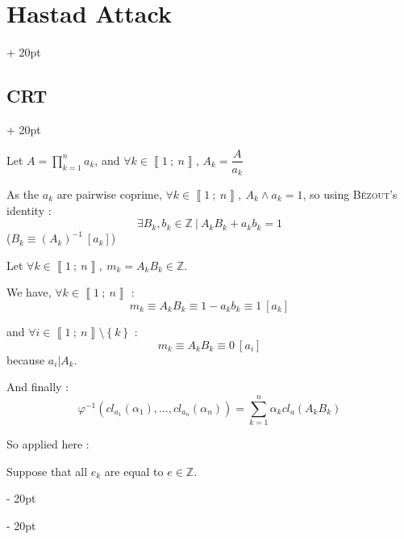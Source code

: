 \documentclass[a4paper, 12pt, twoside]{article}
\newcommand{\Z}{\mathbb{Z}} %
\newcommand{\nset}[2]{\left\llbracket #1\ ;\ #2 \right\rrbracket}
\newcommand{\lr}[1]{\left( #1 \right)}
\newcommand{\set}[1]{\left\{ #1 \right\}}
\newcommand{\ind}[1][20pt]{\advance\leftskip + #1}
\newcommand{\deind}[1][20pt]{\advance\leftskip - #1}
\newenvironment{indt}[2][20pt]{#2 \par \ind[#1]}{\par \deind} %
\begin{document}
\begin{indt}{\section{Hastad Attack}}
\begin{indt}{\subsection{CRT}}
\begin{pseudocode}
                Let $A = \displaystyle \prod_{k = 1}^n a_k$, and $\forall k \in \nset 1 n$, $A_k = \dfrac{A}{a_k}$
            
                As the $a_k$ are pairwise coprime, $\forall k \in \nset 1 n,\ A_k \wedge a_k = 1$, so using \textsc{Bézout}'s identity :
                \[
                    \exists B_k, b_k \in \Z\ |\
                    A_k B_k + a_k b_k = 1
                \]
                ($B_k \equiv \lr{A_k}^{-1}\ [a_k]$)
            
                \vspace{6pt}
            
                Let $\forall k \in \nset 1 n,\ m_k = A_k B_k \in \Z$.
            
                \vspace{6pt}
            
                We have, $\forall k \in \nset 1 n$ :
                \[
                    m_k \equiv A_k B_k \equiv 1 - a_k b_k \equiv 1\ [a_k]
                \]
            
                and $\forall i \in \nset 1 n \setminus \set k$ :
                \[
                    m_k \equiv A_k B_k \equiv 0\ [a_i]
                \]
                because $a_i | A_k$.
            
                \vspace{12pt}
            
                And finally :
                \[
                    \varphi^{-1}\lr{cl_{a_1}(\alpha_1), \ldots, cl_{a_n}(\alpha_n)}
                    =
                    \sum_{k = 1}^n \alpha_k cl_a(A_k B_k)
                \]
            \end{pseudocode}
            
            \vspace{12pt}
            
            So applied here :
            
            
            Suppose that all $e_k$ are equal to $e \in \Z$.
            

\end{indt}
\end{indt}
\end{document}
